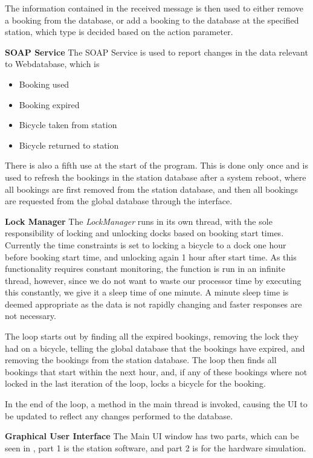 The information contained in the received message is then used to either remove a booking from the database, or add a booking to the database at the specified station, which type is decided based on the action parameter.

\textbf{SOAP Service}
The SOAP Service is used to report changes in the data relevant to Webdatabase, which is
\begin{itemize}
\item Booking used
\item Booking expired
\item Bicycle taken from station
\item Bicycle returned to station
\end{itemize}
There is also a fifth use at the start of the program.
This is done only once and is used to refresh the bookings in the station database after a system reboot, where all bookings are first removed from the station database, and then all bookings are requested from the global database through the interface.

\textbf{Lock Manager}
The \textit{LockManager} runs in its own thread, with the sole responsibility of locking and unlocking docks based on booking start times. 
Currently the time constraints is set to locking a bicycle to a dock one hour before booking start time, and unlocking again 1 hour after start time. 
As this functionality requires constant monitoring, the function is run in an infinite thread, however, since we do not want to waste our processor time by executing this constantly, we give it a sleep time of one minute. 
A minute sleep time is deemed appropriate as the data is not rapidly changing and faster responses are not necessary.

The loop starts out by finding all the expired bookings, removing the lock they had on a bicycle, telling the global database that the bookings have expired, and removing the bookings from the station database.
The loop then finds all bookings that start within the next hour, and, if any of these bookings where not locked in the last iteration of the loop, locks a bicycle for the booking.

In the end of the loop, a method in the main thread is invoked, causing the UI to be updated to reflect any changes performed to the database.


\textbf{Graphical User Interface}
The Main UI window has two parts, which can be seen in , part 1 is the station software, and part 2 is for the hardware simulation.

